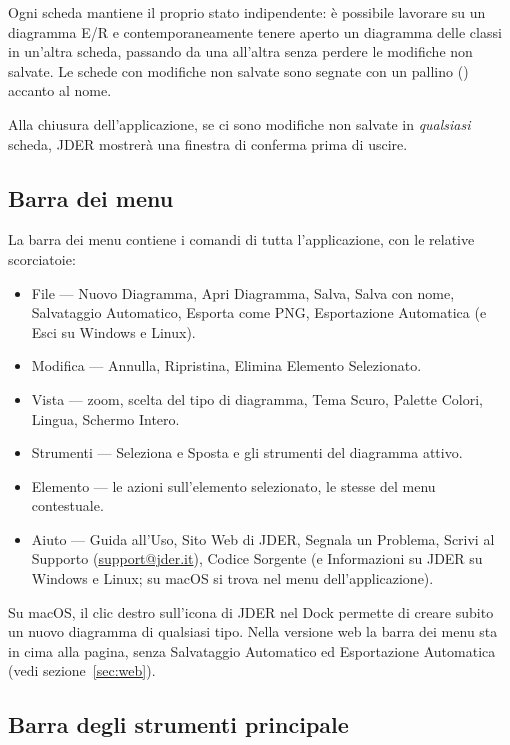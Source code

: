 \documentclass[a4paper,11pt]{article}
\newcommand\mediumweight{\fontseries{mb}\selectfont}
\newcommand\menu[1]{{\mediumweight\color{m3onprimarycontainer}#1}}
\newcommand\jder{{\mediumweight JDER}}
\begin{document}
Ogni scheda mantiene il proprio stato indipendente: è possibile lavorare su un diagramma E/R e
contemporaneamente tenere aperto un diagramma delle classi in un'altra scheda, passando da una
all'altra senza perdere le modifiche non salvate. Le schede con modifiche non salvate sono
segnate con un pallino (\textbullet) accanto al nome.

\begin{tcolorbox}[notebox, title={Nota}]
  Alla chiusura dell'applicazione, se ci sono modifiche non salvate in \emph{qualsiasi} scheda,
  \jder{} mostrerà una finestra di conferma prima di uscire.
\end{tcolorbox}

\subsection{Barra dei menu}

La barra dei menu contiene i comandi di tutta l'applicazione, con le relative scorciatoie:

\begin{itemize}
  \item \menu{File} --- Nuovo Diagramma, Apri Diagramma, Salva, Salva con nome, Salvataggio
        Automatico, Esporta come PNG, Esportazione Automatica (e Esci su Windows e Linux).
  \item \menu{Modifica} --- Annulla, Ripristina, Elimina Elemento Selezionato.
  \item \menu{Vista} --- zoom, scelta del tipo di diagramma, Tema Scuro, Palette Colori, Lingua,
        Schermo Intero.
  \item \menu{Strumenti} --- Seleziona e Sposta e gli strumenti del diagramma attivo.
  \item \menu{Elemento} --- le azioni sull'elemento selezionato, le stesse del menu contestuale.
  \item \menu{Aiuto} --- Guida all'Uso, Sito Web di JDER, Segnala un Problema, Scrivi al Supporto
        (\url{support@jder.it}), Codice Sorgente (e Informazioni su JDER su Windows e Linux; su macOS si
        trova nel menu dell'applicazione).
\end{itemize}

Su macOS, il clic destro sull'icona di \jder{} nel Dock permette di creare subito un nuovo
diagramma di qualsiasi tipo. Nella versione web la barra dei menu sta in cima alla pagina, senza
Salvataggio Automatico ed Esportazione Automatica (vedi sezione~\ref{sec:web}).

\subsection{Barra degli strumenti principale}
\end{document}
